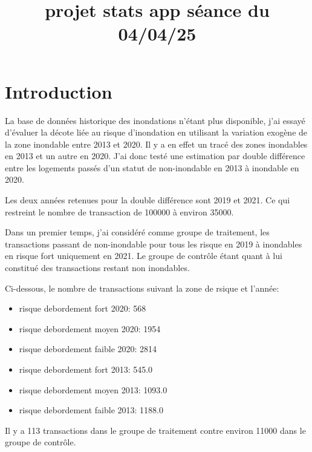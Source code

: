 \documentclass[a4paper,12pt]{article}
\begin{document}
\title{\textbf{projet stats app séance du 04/04/25}}
\maketitle


\section{Introduction}

La base de données historique des inondations n'étant plus disponible, j'ai essayé d'évaluer la décote liée au risque d'inondation en utilisant la variation exogène de la zone inondable entre 2013 et 2020. Il y a en effet un tracé des zones inondables en 2013 et un autre en 2020. J'ai donc testé une estimation par double différence entre les logements passés d'un statut de non-inondable en 2013 à inondable en 2020. \newline

Les deux années retenues pour la double différence sont 2019 et 2021. Ce qui restreint le nombre de transaction de 100000 à environ 35000. \newline

Dans un premier temps, j'ai considéré comme groupe de traitement, les transactions passant de non-inondable pour tous les risque en 2019 à inondables en risque fort uniquement en 2021. Le groupe de contrôle étant quant à lui constitué des transactions restant non inondables. \newline

Ci-dessous, le nombre de transactions suivant la zone de rsique et l'année: 
\begin{itemize}
\item risque debordement fort 2020: 568
\item risque debordement moyen 2020: 1954
\item risque debordement faible 2020: 2814
\item risque debordement fort 2013: 545.0
\item risque debordement moyen 2013: 1093.0
\item risque debordement faible 2013: 1188.0
\end{itemize}
\newline
Il y a 113 transactions dans le groupe de traitement contre environ 11000 dans le groupe de contrôle.\newline
\end{document}
